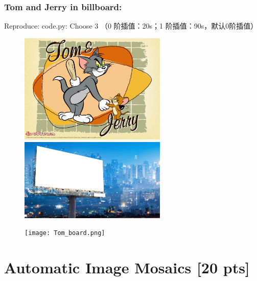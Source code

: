 \documentclass[a4paper,UTF8]{article}
\numberwithin{equation}{section}
\begin{document}
\subsubsection{Tom and Jerry in billboard:}
Reproduce:
code.py: Choose $3$ （0 阶插值：20s；1 阶插值：90s，默认0阶插值）
\begin{figure}[!h]
\centering
\begin{minipage}[t]{0.48\textwidth}
\centering
\includegraphics[width=7cm]{test1-3-in.jpg}
\end{minipage}
\begin{minipage}[t]{0.48\textwidth}
\centering
\includegraphics[width=7cm]{test1-3.png}
\end{minipage}
\end{figure}
\begin{figure}[h]
	\centering  %
	\texttt{[image: Tom\_board.png]}  %
\end{figure}



\newpage
\section{Automatic Image Mosaics [20 pts]}
\end{document}
